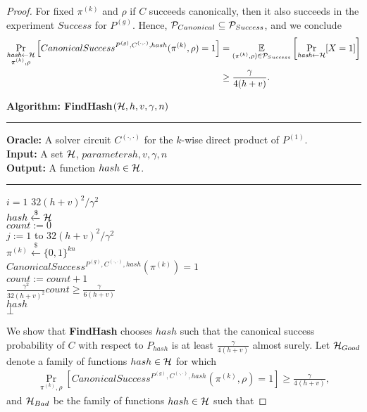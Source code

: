 \begin{proof}
For fixed $\pi^{(k)}$ and $\rho$ if $C$ succeeds canonically, then it also succeeds in the experiment $Success$ for $P^{(g)}$.
Hence, $\mathcal{P}_{Canonical} \subseteq \mathcal{P}_{Success}$, and we conclude
\begin{align}
  \label{ineq:hash_high_prob}
\underset{\substack{\textit{hash} \leftarrow \mathcal{H} \\ \pi^{(k)}, \rho}}{\Pr}\left[CanonicalSuccess^{P^{(g)}, C^{(\cdot, \cdot)}, hash}(\pi^{(k)}, \rho) = 1\right] &=
\underset{{(\pi^{(k)},\rho) \in \mathcal{P}_{Success}}}{\mathbb{E}}\left[\underset{\substack{\textit{hash} \leftarrow \mathcal{H}}}{\Pr}[X = 1]\right] \notag\\
&\geq \frac{\gamma}{4(h+v)}.
\end{align}
%
\begin{codeblock}
  \textbf{Algorithm: FindHash}$(\mathcal{H}, h, v, \gamma, n)$
  \medskip
  \hrule
  \medskip
  \textbf{Oracle:} A solver circuit $C^{(\cdot, \cdot)}$ for the $k$-wise direct product of $P^{(1)}$. \\
  \textbf{Input:} A set $\mathcal{H}$, $parameters h,v,\gamma,n$\\
  \textbf{Output:} A function $hash \in \mathcal{H}$.
  \medskip\hrule\medskip
  \For $i = 1$ \To $32(h+v)^2/\gamma^2$ \\
  \IndI $hash \xleftarrow{\$} \mathcal{H}$ \\
  \IndI $count := 0$ \\
  \IndI \For $j := 1$ to $32(h+v)^2/\gamma^2$ \\
  \IndII $\pi^{(k)} \xleftarrow{\$} \{0,1\}^{kn} $\\
  \IndII \If $CanonicalSuccess^{P^{(g)}, C^{(\cdot, \cdot)}, hash}(\pi^{(k)}) = 1$ \then \\
  \IndIII $count := count + 1$\\
  \IndI \If $\frac{\gamma^2}{32(h+v)^2} count \geq \frac{\gamma}{6(h+v)}$ \\
  \IndII \return $hash$\\
  \return $\bot$
\end{codeblock}
We show that \textbf{FindHash} chooses $hash$ such
that the canonical success probability of $C$
with respect to $P_{hash}$ is at least $\frac{\gamma}{4(h+v)}$ almost surely.
Let $\mathcal{H}_{Good}$ denote a family of functions $hash \in \mathcal{H}$ for which
\begin{align*}
\underset{\pi^{(k)}, \rho}{\Pr}\left[CanonicalSuccess^{P^{(g)}, C^{(\cdot, \cdot)}, hash}(\pi^{(k)}, \rho) = 1\right] \geq \frac{\gamma}{4(h+v)},
\end{align*}
and $\mathcal{H}_{Bad}$ be the family of functions $hash \in \mathcal{H}$ such that

\end{proof}

